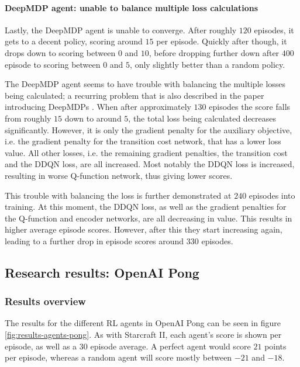 \paragraph{DeepMDP agent: unable to balance multiple loss calculations}

Lastly, the DeepMDP agent is unable to converge. After roughly $120$ episodes, it gets to a decent policy, scoring around $15$ per episode. Quickly after though, it drops down to scoring between $0$ and $10$, before dropping further down after $400$ episode to scoring between $0$ and $5$, only slightly better than a random policy.

The DeepMDP agent seems to have trouble with balancing the multiple losses being calculated; a recurring problem that is also described in the paper introducing DeepMDPs \cite{deepmdp}. When after approximately $130$ episodes the score falls from roughly $15$ down to around $5$, the total loss being calculated decreases significantly. However, it is only the gradient penalty for the auxiliary objective, i.e. the gradient penalty for the transition cost network, that has a lower loss value.  All other losses, i.e. the remaining gradient penalties, the transition cost and the DDQN loss, are all increased. Most notably the DDQN loss is increased, resulting in worse Q-function network, thus giving lower scores.

This trouble with balancing the loss is further demonstrated at $240$ episodes into training. At this moment, the DDQN loss, as well as the gradient penalties for the Q-function and encoder networks, are all decreasing in value. This results in higher average episode scores. However, after this they start increasing again, leading to a further drop in episode scores around $330$ episodes.

\clearpage
\subsection{Research results: OpenAI Pong}\label{research-results-pong}
\subsubsection{Results overview}
The results for the different RL agents in OpenAI Pong can be seen in figure \ref{fig:results-agents-pong}. As with Starcraft II, each agent's score is shown per episode, as well as a $30$ episode average. A perfect agent would score $21$ points per episode, whereas a random agent will score mostly between $-21$ and $-18$.

